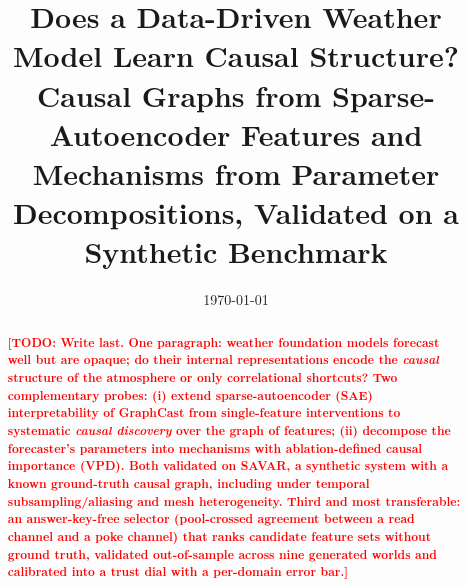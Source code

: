 \documentclass[11pt]{article}
\title{Does a Data-Driven Weather Model Learn Causal Structure?\\
       \large Causal Graphs from Sparse-Autoencoder Features and Mechanisms from
       Parameter Decompositions, Validated on a Synthetic Benchmark}
\author{\todo{authors}}
\date{\today}
\newcommand{\todo}[1]{\textcolor{red}{\textbf{[TODO: #1]}}}
\begin{document}
\maketitle

\begin{abstract}
\todo{Write last. One paragraph: weather foundation models forecast well but are
opaque; do their internal representations encode the \emph{causal} structure of the
atmosphere or only correlational shortcuts? Two complementary probes: (i) extend
sparse-autoencoder (SAE) interpretability of GraphCast from single-feature
interventions to systematic \emph{causal discovery} over the graph of features;
(ii) decompose the forecaster's parameters into mechanisms with ablation-defined
causal importance (VPD). Both validated on SAVAR, a synthetic system with a known
ground-truth causal graph, including under temporal subsampling/aliasing and mesh
heterogeneity. Third and most transferable: an answer-key-free selector
(pool-crossed agreement between a read channel and a poke channel) that ranks
candidate feature sets without ground truth, validated out-of-sample across nine
generated worlds and calibrated into a trust dial with a per-domain error bar.}
\end{abstract}












\end{document}

